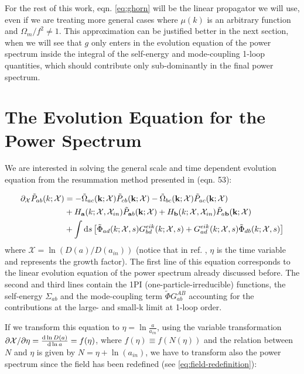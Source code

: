 For the rest of this work, eqn. \ref{eq:ghorn} will be the linear
propagator we will use, even if we are treating more general cases
where $\mu(k)$ is an arbitrary function and $\Omega_{m}/f^{2}\neq1$.
This approximation can be justified better in the next section, when
we will see that $g$ only enters in the evolution equation of the
power spectrum inside the integral of the self-energy and mode-coupling
1-loop quantities, which should contribute only sub-dominantly in
the final power spectrum.


\section{The Evolution Equation for the Power Spectrum \label{sec:The-Evolution-Equation}}

We are interested in solving the general scale and time dependent
evolution equation from the resummation method presented in \cite{anselmi_nonlinear_2012}
(eqn. 53):

\begin{align}
\partial_{\mathcal{X}}\tilde{P}_{ab}(k;\mathcal{X}) & =-\tilde{\Omega}_{ac}(\mathbf{k};\mathcal{X})\tilde{P}_{cb}(\mathbf{k};\mathcal{X})-\tilde{\Omega}_{bc}(\mathbf{k};\mathcal{X})\tilde{P}_{ac}(\mathbf{k};\mathcal{X})\label{eq:evolution-eqn-Chi}\\
 & +H_{\mathbf{a}}(k;\mathcal{X},\mathcal{X}_{in})\tilde{P}_{\mathbf{a}b}(\mathbf{k};\mathcal{X})+H_{\mathbf{b}}(k;\mathcal{X},\mathcal{X}_{in})\tilde{P}_{a\mathbf{b}}(\mathbf{k};\mathcal{X})\nonumber \\
 & +\int\mathrm{d} s\left[\tilde{\Phi}_{ad}(k;\mathcal{X},s)G_{bd}^{eik}(k;\mathcal{X},s)+G_{ad}^{eik}(k;\mathcal{X},s)\tilde{\Phi}_{db}(k;\mathcal{X},s)\right]\nonumber 
\end{align}
where $\mathcal{X}=\ln(D(a)/D(a_{in}))$ (notice that in ref. \cite{anselmi_nonlinear_2012},
$\eta$ is the time variable and represents the growth factor). The
first line of this equation corresponds to the linear evolution equation
of the power spectrum already discussed before. The second and third
lines contain the 1PI (one-particle-irreducible) functions, the self-energy
$\Sigma_{ab}$ and the mode-coupling term $\tilde{\Phi}G_{ab}^{AB}$\textbf{
}accounting for the contributions at the large- and small-k limit
at 1-loop order.


If we transform this equation to $\eta=\ln\frac{a}{a_{in}}$, using
the variable transformation $\partial\mathcal{X}/\partial\eta=\frac{\mathrm{d}\ln D(a)}{\mathrm{d}\ln a}=f(\eta)$,
where $f(\eta)\equiv f(N(\eta))$ and the relation between $N$ and
$\eta$ is given by $N=\eta+\ln(a_{in})$, we have to transform also
the power spectrum since the field has been redefined (see \ref{eq:field-redefinition}):

